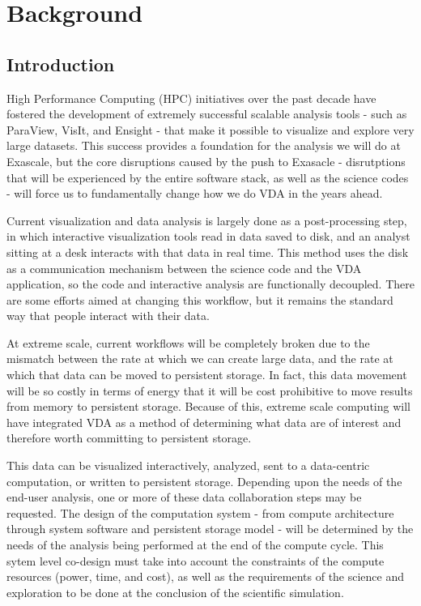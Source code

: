 \section{Background}
\label{sec:Background}

\subsection{Introduction}

High Performance Computing (HPC) initiatives over the past decade have 
fostered the development of extremely successful scalable analysis tools -
such as ParaView, VisIt, and Ensight - that make it possible to visualize 
and explore very large datasets.  This success provides a foundation for 
the analysis we will do at Exascale, but the core disruptions caused by
the push to Exasacle - disrutptions that will be experienced by the entire
software stack, as well as the science codes - will force us to fundamentally
change how we do VDA in the years ahead.

Current visualization
and data analysis is largely done as a post-processing step, in which
interactive visualization tools read in data saved to disk, and an
analyst sitting at a desk interacts with that data in real time.  This
method uses the disk as a communication mechanism between the
science code and the VDA application, so the code and
interactive analysis are functionally decoupled.  There are some 
efforts aimed at changing this workflow, but it remains the standard way
that people interact with their data.

At extreme scale, current workflows will be completely broken due to 
the mismatch
between the rate at which we can create large data, and the rate at
which that data can be moved to persistent storage.  In fact, this
data movement will be so costly in terms of energy that it will be
cost prohibitive to move results from memory to persistent storage.
Because of this, extreme scale computing will have integrated VDA as a
method of determining what data are of interest and therefore worth
committing to persistent storage.

This data can be visualized interactively, analyzed,
sent to a data-centric computation, or written to persistent
storage.  Depending upon the needs of the end-user analysis, one or
more of these data collaboration steps may be requested.  The design
of the computation system - from compute architecture through system
software and persistent storage model - will be determined by the
needs of the analysis being performed at the end of the compute
cycle.  This sytem level co-design must take into account the
constraints of the compute resources (power, time, and cost), as
well as the requirements of the science and exploration to be done
at the conclusion of the scientific simulation.

